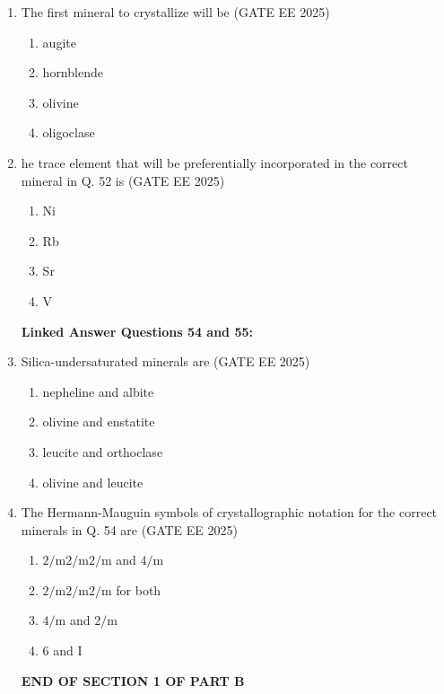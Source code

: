 \documentclass[journal]{IEEEtran}
\begin{document}
\begin{enumerate}[start=1]
\item The first mineral to crystallize will be
\hfill{(GATE EE 2025)}
\begin{enumerate}
    \item augite

 \item hornblende

 \item olivine

 \item oligoclase

\end{enumerate}

\item he trace element that will be preferentially incorporated in the correct mineral in Q. 52 is
\hfill{(GATE EE 2025)}
\begin{enumerate}
    \item Ni

\item Rb

\item Sr

\item V
\end{enumerate}

\textbf{Linked Answer Questions 54 and 55:}
\item Silica-undersaturated minerals are
\hfill{(GATE EE 2025)}
\begin{enumerate}
    \item nepheline and albite

\item  olivine and enstatite

\item leucite and orthoclase

\item olivine and leucite

\end{enumerate}
    
\item The Hermann-Mauguin symbols of crystallographic notation for the correct minerals in Q. 54 are
\hfill{(GATE EE 2025)}
\begin{enumerate}
    \item $2/ \text{m}2/ \text{m}2/ \text{m}$ and $4/ \text{m}$
    \item $2/ \text{m}2/ \text{m}2/ \text{m}$ for both
    \item $4/ \text{m}$ and  $2/ \text{m}$
    \item $6$ and I
    
\end{enumerate}
\vspace{1cm}
\hspace{3cm} \textbf{END OF SECTION 1 OF PART B}
\end{enumerate}
\end{document}

